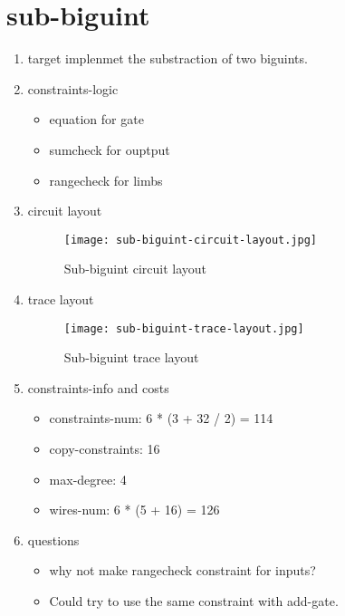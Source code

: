 \section{sub-biguint}
\label{sub-biguint}

\begin{enumerate}
    \item target
        implenmet the substraction of two biguints.
    \item constraints-logic
        \begin{itemize}
            \item equation for gate
            \item sumcheck for ouptput 
            \item rangecheck for limbs
        \end{itemize}
    \item circuit layout
        \begin{figure}[!ht]
            \centering
            \texttt{[image: sub-biguint-circuit-layout.jpg]}
            \caption{Sub-biguint circuit layout}
            \label{fig:sub-biguint-circuit-layout}
        \end{figure}

    \item trace layout
        \begin{figure}[!ht]
            \centering
            \texttt{[image: sub-biguint-trace-layout.jpg]}
            \caption{Sub-biguint trace layout}
            \label{fig:sub-biguint-trace-layout}
        \end{figure}
    
    \item constraints-info and costs
        \begin{itemize}
            \item constraints-num: 6 * (3 + 32 / 2) = 114
            \item copy-constraints: 16
            \item max-degree: 4
            \item wires-num: 6 * (5 + 16) = 126
        \end{itemize}

    \item questions
        \begin{itemize}
            \item why not make rangecheck constraint for inputs?
            \item Could try to use the same constraint with add-gate.
        \end{itemize}

\end{enumerate}